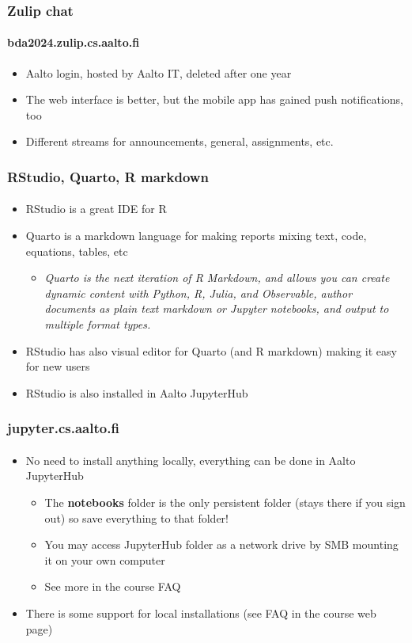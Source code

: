 \documentclass[english,t]{beamer}
\begin{document}
\begin{frame}

  \frametitle{Zulip chat}  %
  \framesubtitle{bda2024.zulip.cs.aalto.fi}

  \begin{itemize}
  \item Aalto login, hosted by Aalto IT, deleted after one year
  \item The web interface is better, but the mobile app has gained
    push notifications, too
  \item Different streams for announcements, general, assignments, etc.
  \end{itemize}
  
\end{frame}

\begin{frame}

  \frametitle{RStudio, Quarto, R markdown}  %
  \framesubtitle{}

  \begin{itemize}
  \item RStudio is a great IDE for R
  \item Quarto is a markdown language for making reports mixing
    text, code, equations, tables, etc
    \begin{itemize}
    \item \textit{Quarto is the next iteration of R Markdown, and
        allows you can create dynamic content with Python, R, Julia,
        and Observable, author documents as plain text markdown or
        Jupyter notebooks, and output to multiple format types.}
    \end{itemize}
  \item RStudio has also visual editor for Quarto (and R markdown)
    making it easy for new users
  \item RStudio is also installed in Aalto JupyterHub
  \end{itemize}
  
\end{frame}  

\begin{frame}

  \frametitle{jupyter.cs.aalto.fi}  %
  \framesubtitle{}

  \begin{itemize}
  \item No need to install anything locally, everything can be done in
    Aalto JupyterHub
    \begin{itemize}
    \item The \textbf{notebooks} folder is the only persistent folder
      (stays there if you sign out) so save everything to that folder!
    \item You may access JupyterHub folder as a network drive by SMB
      mounting it on your own computer
    \item See more in the course FAQ
    \end{itemize}
  \item There is some support for local installations (see FAQ in the
    course web page)
  \end{itemize}
  
\end{frame}  
\end{document}
